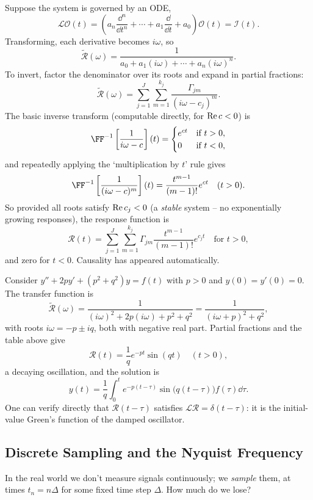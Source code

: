 \documentclass[a4paper]{scrartcl}
\begin{document}
Suppose the system is governed by an ODE,
$$
\mathcal{L} \mathcal{O}(t) = \left(a_n \frac{\dd^n}{\dd t^n} + \cdots + a_1 \frac{\dd}{\dd t} + a_0\right)\mathcal{O}(t) = \mathcal{I}(t).
$$
Transforming, each derivative becomes $i \omega$, so
$$
\tilde{\mathcal{R}}(\omega) = \frac{1}{a_0 + a_1 (i\omega) + \cdots + a_n (i \omega)^n}.
$$
To invert, factor the denominator over its roots and expand in partial fractions:
$$
\tilde{\mathcal{R}}(\omega) = \sum_{j = 1}^{J} \sum_{m = 1}^{k_j} \frac{\Gamma_{jm}}{(i \omega - c_j)^m}.
$$
The basic inverse transform (computable directly, for $\operatorname{Re} c < 0$) is
$$
\FF^{-1}\left[\frac{1}{i\omega - c}\right](t) = \begin{cases}
    e^{ct} &\mbox{if } t > 0, \\
    0 &\mbox{if } t < 0,
\end{cases}
$$
and repeatedly applying the `multiplication by $t$' rule gives
$$
\FF^{-1}\left[\frac{1}{(i \omega - c)^m}\right](t) = \frac{t^{m - 1}}{(m-1)!} e^{ct} \quad (t > 0).
$$
So provided all roots satisfy $\operatorname{Re} c_j < 0$ (a \emph{stable} system -- no exponentially growing responses), the response function is
$$
\mathcal{R}(t) = \sum_{j = 1}^{J}\sum_{m = 1}^{k_j} \Gamma_{jm} \frac{t^{m - 1}}{(m - 1)!} e^{c_j t} \quad \text{for } t > 0,
$$
and zero for $t < 0$. Causality has appeared automatically.

\begin{example}
    Consider $y'' + 2p y' + (p^2 + q^2) y = f(t)$ with $p > 0$ and $y(0) = y'(0) = 0$. The transfer function is
    $$
    \tilde{\mathcal{R}}(\omega) = \frac{1}{(i\omega)^2 + 2p (i \omega) + p^2 + q^2} = \frac{1}{(i \omega + p)^2 + q^2},
    $$
    with roots $i \omega = -p \pm iq$, both with negative real part. Partial fractions and the table above give
    $$
    \mathcal{R}(t) = \frac{1}{q} e^{-pt} \sin (qt) \quad (t > 0),
    $$
    a decaying oscillation, and the solution is
    $$
    y(t) = \frac{1}{q}\int_0^t e^{-p(t - \tau)} \sin\big(q(t - \tau)\big) f(\tau) \dd \tau.
    $$
    One can verify directly that $\mathcal{R}(t - \tau)$ satisfies $\mathcal{L}\mathcal{R} = \delta(t - \tau)$: it is the initial-value Green's function of the damped oscillator.
\end{example}

\subsection{Discrete Sampling and the Nyquist Frequency}

In the real world we don't measure signals continuously; we \emph{sample} them, at times $t_n = n \Delta$ for some fixed time step $\Delta$. How much do we lose?
\end{document}
